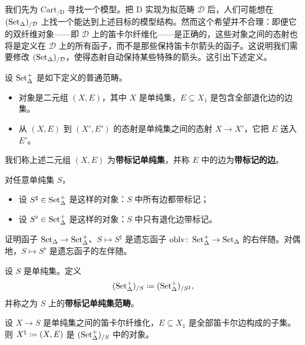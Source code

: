 \nitem\label{L20-2.6} 我们先为 $\mathrm{Cart}_{/\mathrm{D}}$ 寻找一个模型。把 $\mathrm{D}$ 实现为拟范畴 $\mathcal{D}$ 后，人们可能想在 $(\operatorname{Set}_\Delta)_{/\mathcal{D}}$ 上找一个能达到上述目标的模型结构。然而这个希望并不合理：即便它的双纤维对象——即 $\mathcal{D}$ 上的笛卡尔纤维化——是正确的，这些对象之间的态射也将是定义在 $\mathcal{D}$ 上的所有函子，而不是那些保持笛卡尔箭头的函子。这说明我们需要修改 $(\operatorname{Set}_\Delta)_{/\mathcal{D}}$，使得态射自动保持某些特殊的箭头。这引出下述定义。

\begin{definition}\label{L20-2.7}
设 $\operatorname{Set}^+_\Delta$ 是如下定义的普通范畴。
\begin{itemize}[leftmargin=2.2em,itemsep=0.1em]
\item 对象是二元组 $(X,E)$，其中 $X$ 是单纯集，$E\subseteq X_1$ 是包含全部退化边的边集。
\item 从 $(X,E)$ 到 $(X',E')$ 的态射是单纯集之间的态射 $X\to X'$，它把 $E$ 送入 $E'$。
\end{itemize}
我们称上述二元组 $(X,E)$ 为\textbf{带标记单纯集}，并称 $E$ 中的边为\textbf{带标记的边}。
\end{definition}

\begin{example}\label{L20-2.8}
对任意单纯集 $S$，
\begin{itemize}[leftmargin=2.2em,itemsep=0.1em]
\item 设 $S^{\sharp}\in\operatorname{Set}^+_\Delta$ 是这样的对象：$S$ 中所有边都带标记；
\item 设 $S^{\flat}\in\operatorname{Set}^+_\Delta$ 是这样的对象：$S$ 中只有退化边带标记。
\end{itemize}
\end{example}

\begin{exercise}\label{L20-2.9}
证明函子 $\operatorname{Set}_\Delta\to\operatorname{Set}^+_\Delta$、$S\mapsto S^{\sharp}$ 是遗忘函子 $\operatorname{oblv}\colon\operatorname{Set}^+_\Delta\to\operatorname{Set}_\Delta$ 的右伴随。对偶地，$S\mapsto S^{\flat}$ 是遗忘函子的左伴随。
\end{exercise}

\begin{definition}\label{L20-2.10}
设 $S$ 是单纯集。定义
\[
(\operatorname{Set}^+_\Delta)_{/S}\coloneqq(\operatorname{Set}^+_\Delta)_{/S^{\sharp}},
\]
并称之为 $S$ 上的\textbf{带标记单纯集范畴}。
\end{definition}

\begin{example}\label{L20-2.11}
设 $X\to S$ 是单纯集之间的笛卡尔纤维化，$E\subseteq X_1$ 是全部笛卡尔边构成的子集。则 $X^{\natural}\coloneqq(X,E)$ 是 $(\operatorname{Set}^+_\Delta)_{/S}$ 中的对象。
\end{example}

